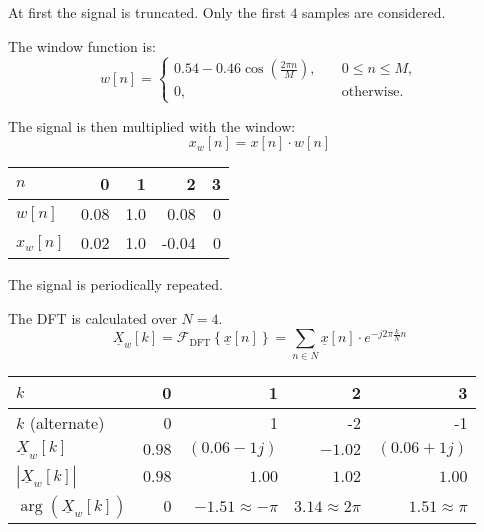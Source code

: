 \begin{solution}
	\begin{tasks}
		\task
		At first the signal is truncated. Only the first $4$ samples are considered.
		
		The window function is:
		\begin{equation*}
			w[n] = \begin{cases}0.54 - 0.46 \cos\left(\frac{2 \pi n}{M}\right), &\quad 0 \leq n \leq M,\\ 0, &\quad \text{otherwise}.\end{cases}
		\end{equation*}
		
		The signal is then multiplied with the window:
		\begin{equation*}
			x_w[n] = x[n] \cdot w[n]
		\end{equation*}
		
		\begin{table}[H]
			\centering
			\begin{tabular}{|l|r|r|r|r|}
				\hline
				$n$ & 0 & 1 & 2 & 3 \\
				\hline
				\hline
				$w[n]$ & 0.08 & 1.0 & 0.08 & 0 \\
				\hline
				$x_w[n]$ & 0.02 & 1.0 & -0.04 & 0 \\
				\hline
			\end{tabular}
		\end{table}
		
		\task
		The signal is periodically repeated.
		
		The DFT is calculated over $N = 4$.
		\begin{equation*}
			\underline{X}_w[k] = \mathcal{F}_{\text{DFT}}\left\{\underline{x}[n]\right\} = \sum\limits_{n \in N} \underline{x}[n] \cdot e^{-j 2\pi \frac{k}{N} n}
		\end{equation*}
		
		\begin{table}[H]
			\centering
			\begin{tabular}{|l|r|r|r|r|}
				\hline
				$k$ & 0 & 1 & 2 & 3 \\
				\hline
				$k$ (alternate) & 0 & 1 & -2 & -1 \\
				\hline
				\hline
				$\underline{X}_w[k]$ & $0.98$ & $(0.06-1j)$ & $-1.02$ & $(0.06+1j)$ \\
				\hline
				$|\underline{X}_w[k]|$ & $0.98$ & $1.00$ & $1.02$ & $1.00$ \\
				\hline
				$\arg\left(\underline{X}_w[k]\right)$ & $0$ & $-1.51 \approx -\pi$ & $3.14 \approx 2\pi$ & $1.51 \approx \pi$ \\
				\hline
			\end{tabular}
		\end{table}
	

\end{tasks}
\end{solution}
